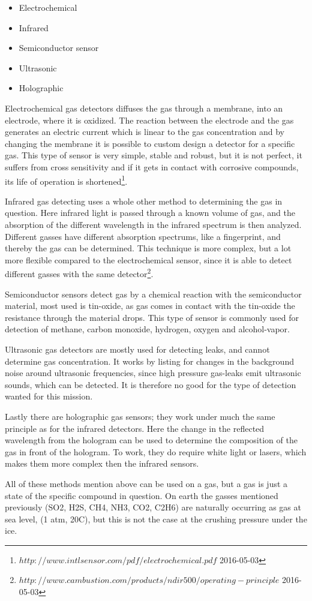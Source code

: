\documentclass[10pt,a4paper,draft]{report}
\begin{document}
\begin{itemize}

   \item Electrochemical
   \item Infrared
   \item Semiconductor sensor
   \item Ultrasonic
   \item Holographic
   
\end{itemize}

Electrochemical gas detectors diffuses the gas through a membrane, into an electrode, where it is oxidized. The reaction between the electrode and the gas generates an electric current which is linear to the gas concentration and by changing the membrane it is possible to custom design a detector for a specific gas. This type of sensor is very simple, stable and robust, but it is not perfect, it suffers from cross sensitivity and if it gets in contact with corrosive compounds, its life of operation is shortened\footnote{$http://www.intlsensor.com/pdf/electrochemical.pdf$ 2016-05-03}.\par
Infrared gas detecting uses a whole other method to determining the gas in question. Here infrared light is passed through a known volume of gas, and the absorption of the different wavelength in the infrared spectrum is then analyzed. Different gasses have different absorption spectrums, like a fingerprint, and thereby the gas can be determined. This technique is more complex, but a lot more flexible compared to the electrochemical sensor, since it is able to detect different gasses with the same detector\footnote{$http://www.cambustion.com/products/ndir500/operating-principle$ 2016-05-03}.\par 
Semiconductor sensors detect gas by a chemical reaction with the semiconductor material, most used is tin-oxide, as gas comes in contact with the tin-oxide the resistance through the material drops. This type of sensor is commonly used for detection of methane, carbon monoxide, hydrogen, oxygen and alcohol-vapor.\par
Ultrasonic gas detectors are mostly used for detecting leaks, and cannot determine gas concentration. It works by listing for changes in the background noise around ultrasonic frequencies, since high pressure gas-leaks emit ultrasonic sounds, which can be detected. It is therefore no good for the type of detection wanted for this mission.\par
Lastly there are holographic gas sensors; they work under much the same principle as for the infrared detectors. Here the change in the reflected wavelength from the hologram can be used to determine the composition of the gas in front of the hologram. To work, they do require white light or lasers, which makes them more complex then the infrared sensors.\par 
All of these methods mention above can be used on a gas, but a gas is just a state of the specific compound in question. On earth the gasses mentioned previously (SO2, H2S, CH4, NH3, CO2, C2H6) are naturally occurring as gas at sea level, (1 atm, 20C), but this is not the case at the crushing pressure under the ice.\par
\end{document}
